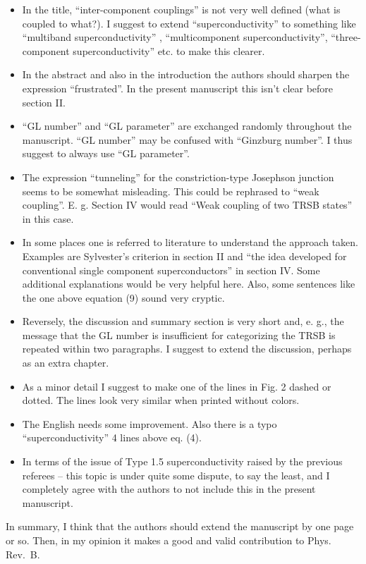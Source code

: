 \documentclass[11pt]{article}
\begin{document}
\begin{itemize}
\item
  In the title, ``inter-component couplings'' is not very well defined
  (what is coupled to what?). I suggest to extend ``superconductivity''
  to something like ``multiband superconductivity'' , ``multicomponent
  superconductivity'', ``three-component superconductivity'' etc. to
  make this clearer.
\item
  In the abstract and also in the introduction the authors should
  sharpen the expression ``frustrated''. In the present manuscript this
  isn't clear before section II.
\item
  ``GL number'' and ``GL parameter'' are exchanged randomly throughout
  the manuscript. ``GL number'' may be confused with ``Ginzburg
  number''. I thus suggest to always use ``GL parameter''.
\item
  The expression ``tunneling'' for the constriction-type Josephson
  junction seems to be somewhat misleading. This could be rephrased to
  ``weak coupling''. E. g. Section IV would read ``Weak coupling of two
  TRSB states'' in this case.
\item
  In some places one is referred to literature to understand the
  approach taken. Examples are Sylvester's criterion in section II and
  ``the idea developed for conventional single component
  superconductors'' in section IV. Some additional explanations would be
  very helpful here. Also, some sentences like the one above equation
  (9) sound very cryptic.
\item
  Reversely, the discussion and summary section is very short and, e.
  g., the message that the GL number is insufficient for categorizing
  the TRSB is repeated within two paragraphs. I suggest to extend the
  discussion, perhaps as an extra chapter.
\item
  As a minor detail I suggest to make one of the lines in Fig. 2 dashed
  or dotted. The lines look very similar when printed without colors.
\item
  The English needs some improvement. Also there is a typo
  ``superconductivity'' 4 lines above eq. (4).
\item
  In terms of the issue of Type 1.5 superconductivity raised by the
  previous referees -- this topic is under quite some dispute, to say
  the least, and I completely agree with the authors to not include this
  in the present manuscript.
\end{itemize}

In summary, I think that the authors should extend the manuscript by one
page or so. Then, in my opinion it makes a good and valid contribution
to Phys. Rev.~B.
\end{document}
